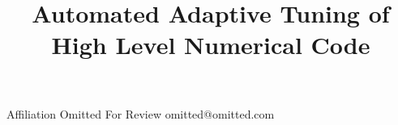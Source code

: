 \documentclass[preprint,9pt]{sigplanconf}
\begin{document}
\copyrightdata{[to be supplied]} 

\titlebanner{}        %

\title{Automated Adaptive Tuning of High Level Numerical Code}

           {Affiliation Omitted For Review}
           {omitted@omitted.com}

\newcommand{\MAP}{\impfnt{map}}
\newcommand{\REDUCE}{\impfnt{reduce}}
\newcommand{\SCAN}{\impfnt{scan}}
\newcommand{\ALLPAIRS}{\impfnt{allpairs}}
\newcommand{\concat}{\ensuremath{+\!\!\!\!+\,}}

\maketitle
\end{document}
